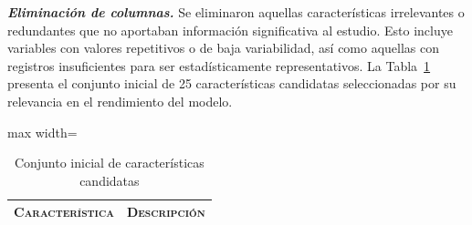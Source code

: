 \documentclass[a4paper,fleqn]{cas-sc}
\begin{document}
\noindent\textbf{\textit{Eliminación de columnas.}}
Se eliminaron aquellas características irrelevantes o redundantes que no aportaban información significativa al estudio. 
Esto incluye variables con valores repetitivos o de baja variabilidad, así como aquellas con registros insuficientes para ser estadísticamente representativos. 
La Tabla~\ref{tab:variables-candidatas1} presenta el conjunto inicial de 25 características candidatas seleccionadas por su relevancia en el rendimiento del modelo.



\begin{table}[t]
	\centering
	\scriptsize
	  \setlength{\tabcolsep}{7pt} 
	\renewcommand{\arraystretch}{1.3} %
	\caption{Conjunto inicial de {características candidatas}} 
	\label{tab:variables-candidatas1} 	
	\begin{adjustbox}{max width=\textwidth}
		\begin{tabular}{ll}
			\hline

	\multicolumn{1}{c}{\textbf{\textsc{Característica}}} & \multicolumn{1}{c}{\textbf{\textsc{Descripción}}}  \\
	\hline
	

\end{tabular}
\end{adjustbox}
\end{table}
\end{document}
